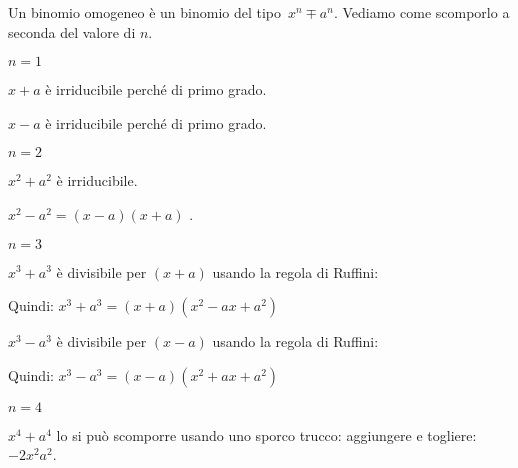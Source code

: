 Un binomio omogeneo è un binomio del tipo~$x^{n} \mp a^{n}$.
Vediamo come scomporlo a seconda del valore di $n$.

\begin{itemize*}
\item $n=1$
 \begin{itemize*}
  \item $x+a$ è irriducibile perché di primo grado.
  \item $x-a$ è irriducibile perché di primo grado.
 \end{itemize*}

 \item $n=2$
 \begin{itemize*}
  \item $x^2+a^2$ è irriducibile.
  \item $x^2-a^2=(x-a)(x+a)$ .
 \end{itemize*}

 \item $n=3$
 \begin{itemize*}
  \item 
 \begin{multicols}{2}
  $x^3+a^3$ è divisibile per $(x+a)$ usando la regola di Ruffini:
   \begin{inaccessibleblock}
    \begin{center}
    
    \end{center}
    \end{inaccessibleblock}
 \end{multicols}
   Quindi: $x^3+a^3=(x+a)(x^2-ax+a^2)$
  \item 
 \begin{multicols}{2}
  $x^3-a^3$ è divisibile per $(x-a)$ usando la regola di Ruffini:
   \begin{inaccessibleblock}
    \begin{center}
    
    \end{center}
    \end{inaccessibleblock}
 \end{multicols}
   Quindi: $x^3-a^3=(x-a)(x^2+ax+a^2)$
 \end{itemize*}

 \item $n=4$
 \begin{itemize*}
  \item $x^4+a^4$ lo si può scomporre usando uno sporco trucco: 
   aggiungere e togliere:~$-2x^2a^2$.
   

\end{itemize*}
\end{itemize*}

